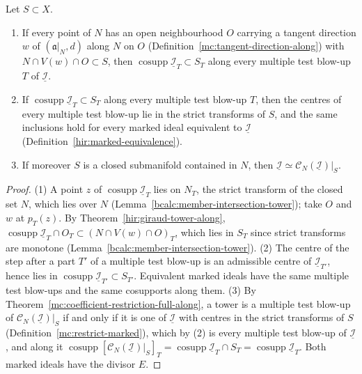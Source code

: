 \begin{lemma}
\label{mc:giraud-local}
\leanok
Let \(S\subset X\).
\begin{enumerate}
\item If every point of \(N\) has an open neighbourhood \(O\) carrying a tangent direction \(w\) of \((\mathfrak a|_N,d)\) along \(N\) on \(O\)
(Definition~\ref{mc:tangent-direction-along}) with \(N\cap V(w)\cap O\subset S\), then \(\operatorname{cosupp}\underline{\mathcal I}_T\subset S_T\) along every multiple test blow-up
\(T\) of \(\underline{\mathcal I}\).
\item If \(\operatorname{cosupp}\underline{\mathcal I}_T\subset S_T\) along every multiple test blow-up \(T\), then the centres of every multiple test blow-up lie in the strict
transforms of \(S\), and the same inclusions hold for every marked ideal equivalent to \(\underline{\mathcal I}\) (Definition~\ref{hir:marked-equivalence}).
\item If moreover \(S\) is a closed submanifold contained in \(N\), then \(\underline{\mathcal I}\simeq\mathcal C_N(\underline{\mathcal I})|_S\).
\end{enumerate}
\end{lemma}
\begin{proof}
\leanok
(1) A point \(z\) of \(\operatorname{cosupp}\underline{\mathcal I}_T\) lies on \(N_T\), the strict transform of the closed set \(N\), which lies over \(N\)
(Lemma~\ref{bcalc:member-intersection-tower}); take \(O\) and \(w\) at \(p_T(z)\). By Theorem~\ref{hir:giraud-tower-along},
\(\operatorname{cosupp}\underline{\mathcal I}_T\cap O_T\subset(N\cap V(w)\cap O)_T\), which lies in \(S_T\) since strict transforms are monotone
(Lemma~\ref{bcalc:member-intersection-tower}). (2) The centre of the step after a part \(T'\) of a multiple test blow-up is an admissible centre of
\(\underline{\mathcal I}_{T'}\), hence lies in \(\operatorname{cosupp}\underline{\mathcal I}_{T'}\subset S_{T'}\). Equivalent marked ideals have the same multiple test blow-ups
and the same cosupports along them. (3) By Theorem~\ref{mc:coefficient-restriction-full-along}, a tower is a multiple test blow-up of \(\mathcal C_N(\underline{\mathcal I})|_S\)
if and only if it is one of \(\underline{\mathcal I}\) with centres in the strict transforms of \(S\) (Definition~\ref{mc:restrict-marked}), which by (2) is every multiple
test blow-up of \(\underline{\mathcal I}\), and along it \(\operatorname{cosupp}[\mathcal C_N(\underline{\mathcal I})|_S]_T=\operatorname{cosupp}\underline{\mathcal I}_T\cap S_T=\operatorname{cosupp}\underline{\mathcal I}_T\).
Both marked ideals have the divisor \(E\).
\end{proof}
